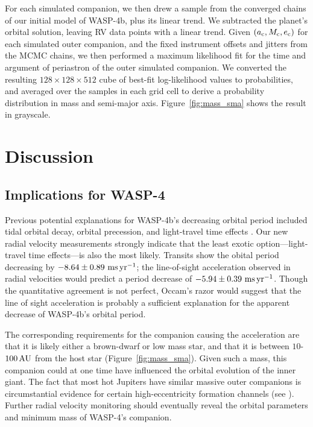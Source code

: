 \documentclass[12pt,twocolumn,tighten]{aastex62}
\begin{document}
For each simulated companion, we then drew a sample from the converged
chains of our initial model of WASP-4b, plus its linear trend. We
subtracted the planet's orbital solution, leaving RV data points with
a linear trend.  Given $(a_{\rm c}, M_{\rm c}, e_{\rm c})$ for each
simulated outer companion, and the fixed instrument offsets and
jitters from the MCMC chains, we then performed a maximum likelihood
fit for the time and argument of periastron of the outer simulated
companion.  We converted the resulting $128\times128\times512$ cube of
best-fit log-likelihood values to probabilities, and averaged over the
samples in each grid cell to derive a probability distribution in mass
and semi-major axis.  Figure~\ref{fig:mass_sma} shows the result in
grayscale.



\section{Discussion}
\label{sec:discussion}

\subsection{Implications for WASP-4}
Previous potential explanations for
WASP-4b's decreasing orbital period included tidal orbital decay, orbital precession, and
light-travel time effects \citep{bouma_wasp4b_2019}.  Our new radial
velocity measurements strongly indicate that the least exotic
option---light-travel time effects---is also the most likely.  Transits show the obital period 
decreasing by 
$- 8.64 \pm 0.89~{\rm ms}\,{\rm yr}^{-1}$; the line-of-sight
acceleration observed
in radial velocities would predict a period decrease of
$-5.94 \pm 0.39~{\rm ms}\,{\rm yr}^{-1}$.
Though the quantitative agreement is not perfect, Occam's razor would
suggest that the line of sight acceleration is probably a sufficient
explanation for the apparent decrease of WASP-4b's orbital period.

The corresponding requirements for the companion causing the
acceleration are that it is likely either a brown-dwarf or low mass
star, and that it is between $10$-$100\,{\rm AU}$ from the host star
(Figure~\ref{fig:mass_sma}).  Given such a mass, this companion could
at one time have influenced the orbital evolution of the inner giant.
The fact that most hot Jupiters have similar massive outer
companions \citep{knutson_friends_2014,bryan_statistics_2016} is
circumstantial evidence for certain high-eccentricity formation
channels (see \citealt{dawson_johnson_2018}).
Further radial velocity monitoring should eventually reveal the
orbital parameters and minimum mass of WASP-4's companion.
\end{document}
